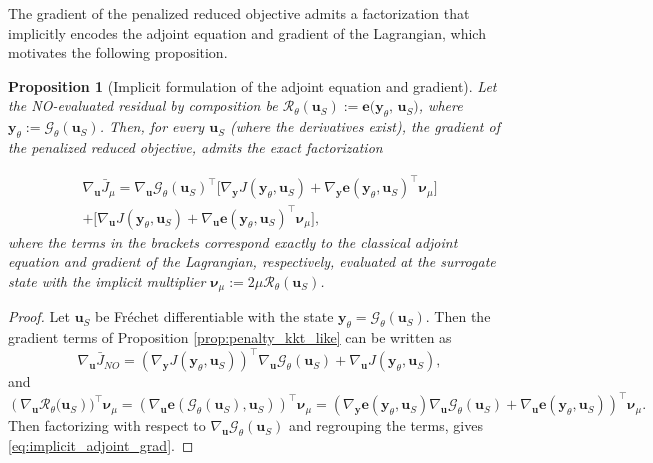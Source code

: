 \documentclass[final,1p,times]{elsarticle}
\theoremstyle{plain} %
\newtheorem{proposition}[theorem]{Proposition}
\theoremstyle{definition} %
\theoremstyle{remark} %
\begin{document}
The gradient of the penalized reduced objective admits a factorization that implicitly encodes the adjoint equation and gradient of the Lagrangian, which motivates the following proposition.

\begin{proposition}[Implicit formulation of the adjoint equation and gradient]\label{prop:implicit_adjoint}
Let the NO-evaluated residual by composition be $\mathcal{R}_\theta(\mathbf{u}_S):=\mathbf{e}\big(\mathbf{y}_\theta,\,\mathbf{u}_S\big)$, where $\mathbf{y}_\theta:= \mathcal{G}_\theta(\mathbf{u}_S)$. Then, for every $\mathbf{u}_S$ (where the derivatives exist), the gradient of the penalized reduced objective, admits the exact factorization 

\begin{equation}\label{eq:implicit_adjoint_grad}
\begin{aligned}
\nabla_\mathbf{u}\bar{J}_\mu=\nabla_{\mathbf{u}}\mathcal{G}_\theta(\mathbf{u}_S)^\top \Big[ \nabla_{\mathbf{y}} J(\mathbf{y}_{\theta}, \mathbf{u}_S) + \nabla_{\mathbf{y}} \mathbf{e}(\mathbf{y}_{\theta}, \mathbf{u}_S)^\top \boldsymbol{\nu}_\mu \Big] \\
+ \Big[ \nabla_{\mathbf{u}} J(\mathbf{y}_{\theta}, \mathbf{u}_S) + \nabla_{\mathbf{u}} \mathbf{e}(\mathbf{y}_{\theta}, \mathbf{u}_S)^\top \boldsymbol{\nu}_\mu \Big] ,
\end{aligned}
\end{equation}
where the terms in the brackets correspond exactly to the classical adjoint equation and gradient of the Lagrangian, respectively, evaluated at the surrogate state with the implicit multiplier $\boldsymbol{\nu}_\mu := 2\mu\mathcal{R}_\theta(\mathbf{u}_S)$.
\end{proposition}

\begin{proof}
Let $\mathbf{u}_S$ be Fréchet differentiable with the state $\mathbf{y}_\theta = \mathcal{G}_\theta(\mathbf{u}_S)$. Then the gradient terms of Proposition \ref{prop:penalty_kkt_like} can be written as
\begin{equation}
\nabla_\mathbf{u}\bar{J}_{NO}=(\nabla_\mathbf{y}J(\mathbf{y}_\theta,\mathbf{u}_S))^\top\nabla_{\mathbf{u}}\mathcal{G}_\theta(\mathbf{u}_S)+ \nabla_{\mathbf{u}}J(\mathbf{y}_\theta,\mathbf{u}_S),
\end{equation}
and
\begin{equation}
({\nabla_{\mathbf{u}}\mathcal{R}_\theta(\mathbf{u}_S}))^\top \boldsymbol{\nu}_\mu = (\nabla_{\mathbf{u}} \mathbf{e}(\mathcal{G}_\theta(\mathbf{u}_S),\mathbf{u}_S))^\top \boldsymbol{\nu}_\mu=
(\nabla_{\mathbf{y}} \mathbf{e}(\mathbf{y}_\theta, \mathbf{u}_S)\nabla_\mathbf{u}\mathcal{G}_\theta(\mathbf{u}_S)+ \nabla_\mathbf{u}\mathbf{e}(\mathbf{y}_\theta, \mathbf{u}_S))^\top\boldsymbol{\nu}_\mu.
\end{equation} 
Then factorizing with respect to $\nabla_\mathbf{u}\mathcal{G}_\theta(\mathbf{u}_S)$ and regrouping the terms, gives \eqref{eq:implicit_adjoint_grad}.
\end{proof}
\end{document}
